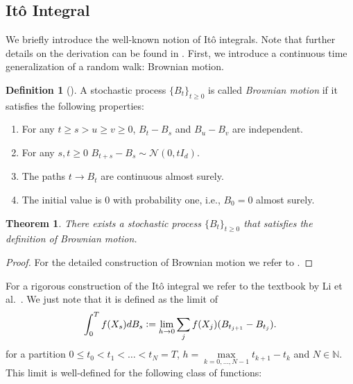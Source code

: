 \documentclass[12pt]{article}
\newtheorem{theorem}{Theorem}[section]
\theoremstyle{definition}
\newtheorem{definition}[definition]{Definition}
\numberwithin{equation}{section}
\newcommand{\N}{\mathbb{N}}
\newcommand{\R}{\mathbb{R}}
\newcommand{\CN}{\mathcal{N}}
\newcommand{\defeq}{\vcentcolon=}
\begin{document}
\subsection{Itô Integral}
\label{subsec:ItoIntegral}
We briefly introduce the well-known notion of Itô integrals. Note that further details on the derivation can be found in \autocite{eAppliedStochasticAnalysis2021}. 
First, we introduce a continuous time generalization of a random walk: Brownian motion.
\begin{definition}[\autocite{durrettProbabilityTheoryExamples2019}]
  A stochastic process $\{B_t\}_{t \geq 0}$ is called \emph{Brownian motion} if it satisfies the following properties:
  \begin{enumerate}[label=(\roman*)]
    \item For any $t \geq s > u \geq v \geq 0$, $B_{t} - B_s$ and $B_{u} - B_v$ are independent.
    \item For any $s,t \geq 0$ $B_{t+s} - B_s \sim \CN(0, tI_d)$.
    \item The paths $t \rightarrow B_t$ are continuous almost surely.
    \item The initial value is 0 with probability one, i.e., $B_0 = 0$ almost surely.
  \end{enumerate}
\end{definition}
\begin{theorem}
  There exists a stochastic process $\{B_t\}_{t \geq 0}$ that satisfies the definition of Brownian motion.
\end{theorem}
\begin{proof}
  For the detailed construction of Brownian motion we refer to \autocite{durrettProbabilityTheoryExamples2019}.
\end{proof}
For a rigorous construction of the Itô integral we refer to the textbook by Li et al.\ \cite{eAppliedStochasticAnalysis2021}.
We just note that it is defined as the limit of 
\begin{equation*}
  \int_0^T f(X_s) dB_s \defeq \lim\limits_{h \rightarrow 0} \sum_j f(X_j)(B_{t_{j+1}} - B_{t_j}).
\end{equation*}
for a partition $0 \leq t_0 < t_1 < \dots < t_N = T$, $h = \max\limits_{k=0,\dots,N-1} t_{k+1} - t_k$ and $N \in \N$. This limit is well-defined for the following class of functions:
\end{document}
